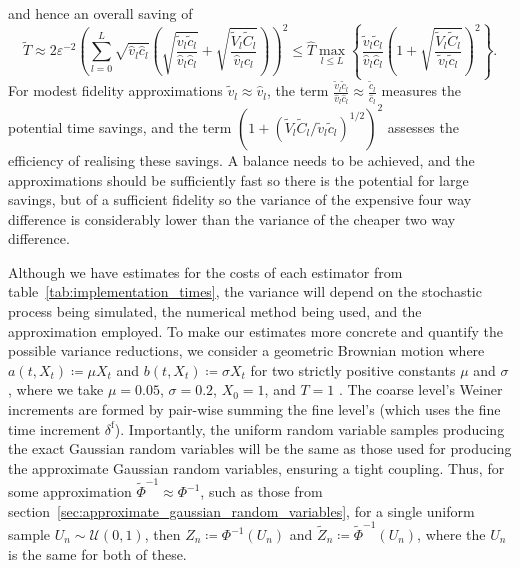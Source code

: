 \documentclass[manuscript,review]{acmart}
\begin{document}
and hence an overall saving of
\begin{equation*}
\tilde{T} 
\approx 2\varepsilon^{-2} \left(\sum_{l=0}^L \sqrt{\hat{v}_l \hat{c}_l} \left( \sqrt{\dfrac{\tilde{v}_l\tilde{c}_l}{\hat{v}_l\hat{c}_l}} + \sqrt{\dfrac{\tilde{V}_l \tilde{C}_l}{\hat{v}_l \hat{c}_l}}\right)\right)^2 
\leq \hat{T} \max_{l \leq L} \left\{ \dfrac{\tilde{v}_l\tilde{c}_l}{\hat{v}_l\hat{c}_l} \left(1 + \sqrt{\dfrac{\tilde{V}_l \tilde{C}_l}{\tilde{v}_l \tilde{c}_l}}\right)^2\right\}.
\end{equation*}
For modest fidelity approximations $ \tilde{v}_l \approx \hat{v}_l $, the term $ \tfrac{\tilde{v}_l\tilde{c}_l}{\hat{v}_l\hat{c}_l} \approx \tfrac{\tilde{c}_l}{\hat{c}_l}$ measures the potential time savings, and the term $ (1 + (\tilde{V}_l \tilde{C}_l / \tilde{v}_l \tilde{c}_l)^{1/2})^2 $ assesses the efficiency of realising these savings. A balance needs to be achieved, and the approximations should be sufficiently fast so there is the potential for large savings, but of a sufficient fidelity so the variance of the expensive four way difference is considerably lower than the variance of the cheaper two way difference.

Although we have estimates for the costs of each estimator from table~\ref{tab:implementation_times}, the variance will depend on the stochastic process being simulated, the numerical method being used, and the approximation employed. To make our estimates more concrete and quantify the possible variance reductions, we consider a geometric Brownian motion where $ a(t, X_t) \coloneqq \mu X_t $ and $ b(t, X_t) \coloneqq \sigma X_t $ for two strictly positive constants $ \mu $ and $ \sigma $, where we take $ \mu = 0.05 $, $ \sigma = 0.2 $, $ X_0 = 1 $, and $ T = 1 $ \citep[6.1]{giles2008multilevel}. The coarse level's Weiner increments are formed by pair-wise summing the fine level's (which uses the fine time increment $ \delta^{\mathrm{f}} $). Importantly, the uniform random variable samples producing the exact Gaussian random variables will be the same as those used for producing the approximate Gaussian random variables, ensuring a tight coupling. Thus, for some approximation $ \tilde{\Phi}^{-1} \approx \Phi^{-1} $, such as those from section~\ref{sec:approximate_gaussian_random_variables}, for a single uniform sample $ U_n \sim \mathcal{U}(0, 1) $, then $ Z_n \coloneqq \Phi^{-1}(U_n) $ and $ \tilde{Z}_n \coloneqq \tilde{\Phi}^{-1}(U_n) $, where the $ U_n $ is the same for both of these.
\end{document}

